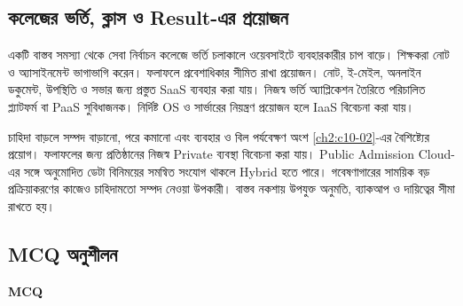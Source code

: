 \subsection{কলেজের ভর্তি, ক্লাস ও Result-এর প্রয়োজন}
\label{ch2:c10-14}
\begin{examplebox}{একটি বাস্তব সমস্যা থেকে সেবা নির্বাচন}
কলেজে ভর্তি চলাকালে ওয়েবসাইটে ব্যবহারকারীর চাপ বাড়ে। শিক্ষকরা নোট ও অ্যাসাইনমেন্ট ভাগাভাগি করেন। ফলাফলে প্রবেশাধিকার সীমিত রাখা প্রয়োজন। নোট, ই-মেইল, অনলাইন ডকুমেন্ট, উপস্থিতি ও সভার জন্য প্রস্তুত SaaS ব্যবহার করা যায়। নিজস্ব ভর্তি অ্যাপ্লিকেশন তৈরিতে পরিচালিত প্ল্যাটফর্ম বা PaaS সুবিধাজনক। নির্দিষ্ট OS ও সার্ভারের নিয়ন্ত্রণ প্রয়োজন হলে IaaS বিবেচনা করা যায়।

চাহিদা বাড়লে সম্পদ বাড়ানো, পরে কমানো এবং ব্যবহার ও বিল পর্যবেক্ষণ অংশ \ref{ch2:c10-02}-এর বৈশিষ্ট্যের প্রয়োগ। ফলাফলের জন্য প্রতিষ্ঠানের নিজস্ব Private ব্যবস্থা বিবেচনা করা যায়। Public Admission Cloud-এর সঙ্গে অনুমোদিত ডেটা বিনিময়ের সমন্বিত সংযোগ থাকলে Hybrid হতে পারে। গবেষণাগারের সাময়িক বড় প্রক্রিয়াকরণের কাজেও চাহিদামতো সম্পদ নেওয়া উপকারী। বাস্তব নকশায় উপযুক্ত অনুমতি, ব্যাকআপ ও দায়িত্বের সীমা রাখতে হয়।
\end{examplebox}

\subsection{MCQ অনুশীলন}

\par
\textbf{MCQ}

